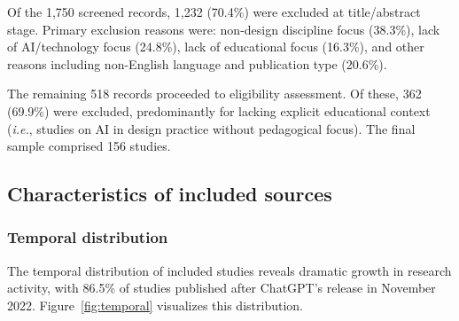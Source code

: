 \documentclass[ed]{acnsart}
\newcommand{\ie}{\textit{i.e.}}
\newcommand{\nstudies}{156}
\begin{document}
Of the 1,750 screened records, 1,232 (70.4\%) were excluded at title/abstract stage. Primary exclusion reasons were: non-design discipline focus (38.3\%), lack of AI/technology focus (24.8\%), lack of educational focus (16.3\%), and other reasons including non-English language and publication type (20.6\%).

The remaining 518 records proceeded to eligibility assessment. Of these, 362 (69.9\%) were excluded, predominantly for lacking explicit educational context (\ie, studies on AI in design practice without pedagogical focus). The final sample comprised \nstudies{} studies.

\subsection{Characteristics of included sources}

\subsubsection{Temporal distribution}

The temporal distribution of included studies reveals dramatic growth in research activity, with 86.5\% of studies published after ChatGPT's release in November 2022. Figure~\ref{fig:temporal} visualizes this distribution.

%
%
%
%
%
\end{document}
